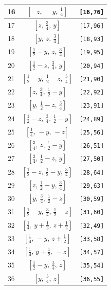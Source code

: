 \documentclass[fleqn,8pt]{jsarticle}
\begin{document}
\begin{longtable}{ccc}
16 & $\left[ - z,\, - y,\, \frac{1}{4} \right]$ & {\tt [16,76]} \\ \hline
17 & $\left[ z,\, \frac{3}{4},\, y \right]$ & {\tt [17,96]} \\ \hline
18 & $\left[ y,\, z,\, \frac{3}{4} \right]$ & {\tt [18,93]} \\ \hline
19 & $\left[ \frac{1}{2} - y,\, z,\, \frac{3}{4} \right]$ & {\tt [19,95]} \\ \hline
20 & $\left[ \frac{1}{2} - z,\, \frac{3}{4},\, y \right]$ & {\tt [20,94]} \\ \hline
21 & $\left[ \frac{1}{2} - y,\, \frac{1}{2} - z,\, \frac{3}{4} \right]$ & {\tt [21,90]} \\ \hline
22 & $\left[ z,\, \frac{3}{4},\, \frac{1}{2} - y \right]$ & {\tt [22,92]} \\ \hline
23 & $\left[ y,\, \frac{1}{2} - z,\, \frac{3}{4} \right]$ & {\tt [23,91]} \\ \hline
24 & $\left[ \frac{1}{2} - z,\, \frac{3}{4},\, \frac{1}{2} - y \right]$ & {\tt [24,89]} \\ \hline
25 & $\left[ \frac{1}{4},\, - y,\, - z \right]$ & {\tt [25,56]} \\ \hline
26 & $\left[ \frac{3}{4},\, z,\, \frac{1}{2} - y \right]$ & {\tt [26,51]} \\ \hline
27 & $\left[ \frac{3}{4},\, \frac{1}{2} - z,\, y \right]$ & {\tt [27,50]} \\ \hline
28 & $\left[ \frac{1}{2} - z,\, \frac{1}{2} - y,\, \frac{3}{4} \right]$ & {\tt [28,64]} \\ \hline
29 & $\left[ z,\, \frac{1}{2} - y,\, \frac{3}{4} \right]$ & {\tt [29,63]} \\ \hline
30 & $\left[ y,\, \frac{3}{4},\, \frac{1}{2} - z \right]$ & {\tt [30,59]} \\ \hline
31 & $\left[ \frac{1}{2} - y,\, \frac{3}{4},\, \frac{1}{2} - z \right]$ & {\tt [31,60]} \\ \hline
32 & $\left[ \frac{1}{4},\, y + \frac{1}{2},\, z + \frac{1}{2} \right]$ & {\tt [32,49]} \\ \hline
33 & $\left[ \frac{1}{4},\, - y,\, z + \frac{1}{2} \right]$ & {\tt [33,58]} \\ \hline
34 & $\left[ \frac{1}{4},\, y + \frac{1}{2},\, - z \right]$ & {\tt [34,57]} \\ \hline
35 & $\left[ \frac{1}{2} - y,\, \frac{3}{4},\, z \right]$ & {\tt [35,54]} \\ \hline
36 & $\left[ y,\, \frac{3}{4},\, z \right]$ & {\tt [36,55]} \\ \hline

\end{longtable}
\end{document}
